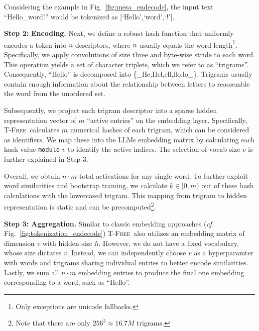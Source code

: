 \documentclass[11pt]{article}
\newcommand{\ps}[1]{\textcolor{purple}{PS: #1}}
\newcommand{\bd}[1]{\textcolor{pink}{BD: #1}}
\newcommand{\method}{\textsc{T-Free}}
\begin{document}
Considering the example in  Fig.~\ref{fig:mesa_endecode}, the input text ``Hello\_word!'' would be tokenized as [`Hello',`word',`!'].

\textbf{Step 2: Encoding.} Next, we define a robust hash function that uniformly encodes a token into $n$ descriptors, where $n$ usually equals the word-length\footnote{Only exceptions are unicode fallbacks.}.
Specifically, we apply convolutions of size three and byte-wise stride to each word. This operation yields a set of character triplets, which we refer to as ``trigrams''. 
Consequently, ``Hello'' is decomposed into \{\_He,Hel,ell,llo,lo\_\}.
Trigrams usually contain enough information about the relationship between letters to reassemble the word from the unordered set. 

Subsequently, we project each trigram descriptor into a sparse hidden representation vector of $m$ ``active entries'' on the embedding layer. 
Specifically, \method~calculates $m$ numerical hashes of each trigram, which can be considered as identifiers.
We map these into the LLMs embedding matrix by calculating each hash value \texttt{modulo} $v$ to identify the active indices. The selection of vocab size $v$ is further explained in Step 3.

Overall, we obtain $n\cdot m$ total activations for any single word.
To further exploit word similarities and bootstrap training, we calculate $k\in [0,m)$ out of these hash calculations with the lowercased trigram.
%
This mapping from trigram to hidden representation is static and can be precomputed\footnote{Note that there are only $256^3\approx 16.7M$ trigrams.}.


\textbf{Step 3: Aggregation.}
Similar to classic embedding approaches (\emph{cf.} Fig.~\ref{fig:tokenization_endecode}) \method~also utilizes an embedding matrix of dimension $v$ with hidden size $h$. However, we do not have a fixed vocabulary, whose size dictates $v$. Instead, we can independently choose $v$ as a hyperparamter with words and trigrams sharing individual entries to better encode similarities. 
Lastly, we sum all $n\cdot m$ embedding entries to produce the final one embedding corresponding to a word, such as ``Hello''.
\end{document}
